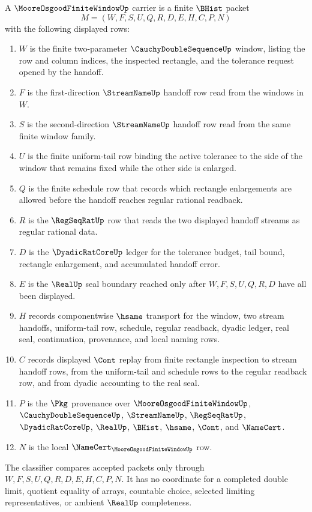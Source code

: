 \begin{definition}\label{def:moore-osgood-finite-window-carrier}
A $\MooreOsgoodFiniteWindowUp$ carrier is a finite $\BHist$ packet
$$
M=(W,F,S,U,Q,R,D,E,H,C,P,N)
$$
with the following displayed rows:
\begin{enumerate}
\item $W$ is the finite two-parameter $\CauchyDoubleSequenceUp$ window, listing the row and column indices, the inspected rectangle, and the tolerance request opened by the handoff.
\item $F$ is the first-direction $\StreamNameUp$ handoff row read from the windows in $W$.
\item $S$ is the second-direction $\StreamNameUp$ handoff row read from the same finite window family.
\item $U$ is the finite uniform-tail row binding the active tolerance to the side of the window that remains fixed while the other side is enlarged.
\item $Q$ is the finite schedule row that records which rectangle enlargements are allowed before the handoff reaches regular rational readback.
\item $R$ is the $\RegSeqRatUp$ row that reads the two displayed handoff streams as regular rational data.
\item $D$ is the $\DyadicRatCoreUp$ ledger for the tolerance budget, tail bound, rectangle enlargement, and accumulated handoff error.
\item $E$ is the $\RealUp$ seal boundary reached only after $W,F,S,U,Q,R,D$ have all been displayed.
\item $H$ records componentwise $\hsame$ transport for the window, two stream handoffs, uniform-tail row, schedule, regular readback, dyadic ledger, real seal, continuation, provenance, and local naming rows.
\item $C$ records displayed $\Cont$ replay from finite rectangle inspection to stream handoff rows, from the uniform-tail and schedule rows to the regular readback row, and from dyadic accounting to the real seal.
\item $P$ is the $\Pkg$ provenance over $\MooreOsgoodFiniteWindowUp$, $\CauchyDoubleSequenceUp$, $\StreamNameUp$, $\RegSeqRatUp$, $\DyadicRatCoreUp$, $\RealUp$, $\BHist$, $\hsame$, $\Cont$, and $\NameCert$.
\item $N$ is the local $\NameCert_{\MooreOsgoodFiniteWindowUp}$ row.
\end{enumerate}
The classifier compares accepted packets only through $W,F,S,U,Q,R,D,E,H,C,P,N$. It has no coordinate for a completed double limit, quotient equality of arrays, countable choice, selected limiting representatives, or ambient $\RealUp$ completeness.
\end{definition}

